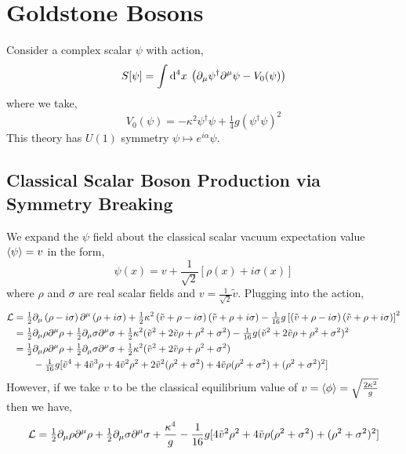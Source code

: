 \documentclass[12pt]{article}
\begin{document}
\section{Goldstone Bosons}

Consider a complex scalar $\psi$ with action,
\[ S[\psi] = \int \mathrm{d}^{4} x \: \left( \partial_\mu \psi^\dagger \partial^\mu \psi - V_0(\psi) \right) \]
where we take,
\[ V_0(\psi) = - \kappa^2 \psi^\dagger \psi + \tfrac{1}{4} g (\psi^\dagger \psi)^2 \]
This theory has $U(1)$ symmetry $\psi \mapsto e^{i\alpha} \psi$. 

\subsection{Classical Scalar Boson Production via Symmetry Breaking}

We expand the $\psi$ field about the classical scalar vacuum expectation value $\left< \psi \right> = v$ in the form,
\[ \psi(x) = v + \frac{1}{\sqrt{2}} \left[ \rho(x) + i \sigma(x) \right] \]
where $\rho$ and $\sigma$ are real scalar fields and $v = \frac{1}{\sqrt{2}} \tilde{v}$. Plugging into the action,
\begin{align*}
\mathcal{L} & = \tfrac{1}{2} \partial_\mu \left( \rho - i \sigma \right) \partial^\mu \left( \rho + i \sigma \right) + \tfrac{1}{2} \kappa^2 \left( \tilde{v} +  \rho - i \sigma \right) \left( \tilde{v} + \rho + i \sigma \right) - \tfrac{1}{16} g \left[ \left( \tilde{v} +  \rho - i \sigma \right) \left( \tilde{v} + \rho + i \sigma \right) \right]^2 
\\
& = \tfrac{1}{2} \partial_\mu \rho \partial^\mu \rho + \tfrac{1}{2} \partial_\mu \sigma \partial^\mu \sigma + \tfrac{1}{2} \kappa^2 (\tilde{v}^2 + 2 \tilde{v} \rho + \rho^2 + \sigma^2) - \tfrac{1}{16} g (\tilde{v}^2 + 2 \tilde{v} \rho + \rho^2 + \sigma^2)^2
\\
& = \tfrac{1}{2} \partial_\mu \rho \partial^\mu \rho + \tfrac{1}{2} \partial_\mu \sigma \partial^\mu \sigma + \tfrac{1}{2} \kappa^2 (\tilde{v}^2 + 2 \tilde{v} \rho + \rho^2 + \sigma^2)
\\
& \quad \quad - \tfrac{1}{16} g[\tilde{v}^4 + 4 \tilde{v}^3 \rho + 4\tilde{v}^2 \rho^2 + 2 \tilde{v}^2( \rho^2 + \sigma^2) + 4 \tilde{v} \rho (\rho^2 + \sigma^2) + (\rho^2 + \sigma^2)^2]
\end{align*}
However, if we take $v$ to be the classical equilibrium value of $v = \left< \phi \right> = \sqrt{\frac{2 \kappa^2}{g}}$ then we have,
\begin{align*}
\mathcal{L} = \tfrac{1}{2} \partial_\mu \rho \partial^\mu \rho + \tfrac{1}{2} \partial_\mu \sigma \partial^\mu \sigma + \frac{\kappa^4}{g} - \frac{1}{16} g[4\tilde{v}^2 \rho^2 + 4 \tilde{v} \rho (\rho^2 + \sigma^2) + (\rho^2 + \sigma^2)^2]
\end{align*}
\end{document}
